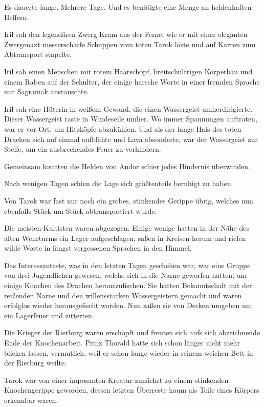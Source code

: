 Es dauerte lange. Mehrere Tage. Und es benötigte eine Menge an heldenhaften Helfern.

Iril sah den legendären Zwerg Kram aus der Ferne, wie er mit einer eleganten Zwergenaxt messerscharfe Schuppen vom toten Tarok löste und auf Karren zum Abtransport stapelte.

Iril sah einen Menschen mit rotem Haarschopf, breitschultrigen Körperbau und einem Raben auf der Schulter, der einige harsche Worte in einer fremden Sprache mit Sagramak austauschte.

Iril sah eine Hüterin in weißem Gewand, die einen Wassergeist umherdirigierte. Dieser Wassergeist raste in Windeseile umher. Wo immer Spannungen auftraten, war er vor Ort, um Hitzköpfe abzukühlen. Und als der lange Hals des toten Drachen sich auf einmal aufblähte und Lava absonderte, war der Wassergeist zur Stelle, um ein ausbrechendes Feuer zu verhindern.

Gemeinsam konnten die Helden von Andor schier jedes Hindernis überwinden.



\trennzeichen



Nach wenigen Tagen schien die Lage sich größtenteils beruhigt zu haben.

Von Tarok war fast nur noch ein grobes, stinkendes Gerippe übrig, welches nun ebenfalls Stück um Stück abtransportiert wurde.

Die meisten Kultisten waren abgezogen. Einige wenige hatten in der Nähe des alten Wehrturms ein Lager aufgeschlagen, saßen in Kreisen herum und riefen wilde Worte in längst vergessenen Sprachen in den Himmel.

Das Interessanteste, was in den letzten Tagen geschehen war, war eine Gruppe von drei Jugendlichen gewesen, welche sich in die Narne geworfen hatten, um einige Knochen des Drachen herauszufischen. Sie hatten Bekanntschaft mit der reißenden Narne und den willensstarken Wassergeistern gemacht und waren erfolglos wieder herausgefischt worden. Nun saßen sie von Decken umgeben um ein Lagerfeuer und zitterten.

Die Krieger der Rietburg waren erschöpft und freuten sich aufs sich abzeichnende Ende der Knochenarbeit. Prinz Thorald hatte sich schon länger nicht mehr blicken lassen, vermutlich, weil er schon lange wieder in seinem weichen Bett in der Rietburg weilte.

Tarok war von einer imposanten Kreatur zunächst zu einem stinkenden Knochengerippe geworden, dessen letzten Überreste kaum als Teile eines Körpers erkennbar waren.

